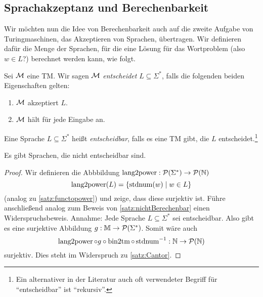\subsection{Sprachakzeptanz und Berechenbarkeit}
Wir möchten nun die Idee von Berechenbarkeit auch auf die zweite Aufgabe von Turingmaschinen, das Akzeptieren von Sprachen, übertragen.
Wir definieren dafür die Menge der Sprachen, für die eine Lösung für das Wortproblem (also $w\in L$?) berechnet werden kann, wie folgt.

\begin{Def}[name={[Entscheidbarkeit]}]\label{def:entscheidbarkeit}
	Sei $\mathcal{M}$ eine \ac{TM}.
	Wir sagen $\mathcal{M}$ \emph{entscheidet} $L\subseteq\Sigma^*$, falls die folgenden beiden Eigenschaften gelten:
	\begin{enumerate}
		\item $\mathcal{M}$ akzeptiert $L$.
		\item $\mathcal{M}$ hält für jede Eingabe an.
	\end{enumerate}
	
	Eine Sprache $L\subseteq\Sigma^*$ heißt \emph{entscheidbar}, falls es eine \ac{TM} gibt, die $L$ entscheidet.\footnote{
		Ein alternativer in der Literatur auch oft verwendeter Begriff für "`entscheidbar"' ist "`rekursiv"'.}
	
\end{Def}


\begin{Satz}[name={[nicht entscheidbare Sprache]}]\label{satz:NichtEntscheidbareSprache}
	Es gibt Sprachen, die nicht entscheidbar sind.
\end{Satz}

\begin{proof}
	Wir definieren die Abbbildung \mbox{$\operatorname{lang2power}:\mathcal{P}(\Sigma^*)\rightarrow \mathcal{P}(\mathbb{N})$}
	$$\operatorname{lang2power}(L)=\{\operatorname{stdnum}(w) \mid w\in L\}$$
	(analog zu \autoref{satz:functopower}) und zeige, dass diese surjektiv ist.
	Führe anschließend analog zum Beweis von \autoref{satz:nichtBerechenbar} einen Widerspruchsbeweis.
	Annahme: Jede Sprache $L\subseteq\Sigma^*$ sei entscheidbar. Also gibt es eine surjektive Abbildung $g:\mathbb{M}\rightarrow\mathcal{P}(\Sigma^*)$.
	Somit wäre auch 
	$$\operatorname{lang2power}\circ g \circ\operatorname{bin2tm}\circ \operatorname{stdnum}^{-1}:\mathbb{N}\rightarrow\mathcal{P}(\mathbb{N})$$
	surjektiv.
	Dies steht im Widerspruch zu \autoref{satz:Cantor}.
\end{proof}

